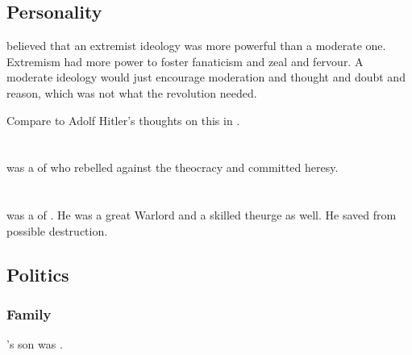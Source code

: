 \subsection{Personality}
\Tezrabal believed that an extremist ideology was more powerful than a moderate one.
Extremism had more power to foster fanaticism and zeal and fervour. 
A moderate ideology would just encourage moderation and thought and doubt and reason, which was not what the revolution needed.

Compare to Adolf Hitler's thoughts on this in \cite{AdolfHitler:MeinKampf}. 















\section[Monara]{\Monara}
\index{\Monara}
\Monara was a \resphan of \Merkyrah who rebelled against the \Merkyran theocracy and committed heresy.















\section{\Sharrath}
\index{\Sharrath}
\Sharrath was a \resphan of \Mystraacht. 
He was a great Warlord and a skilled theurge as well.
He saved \Merkyrah from possible destruction.








\subsection{Politics}





\subsubsection{Family}
\Sharrath's son was .















